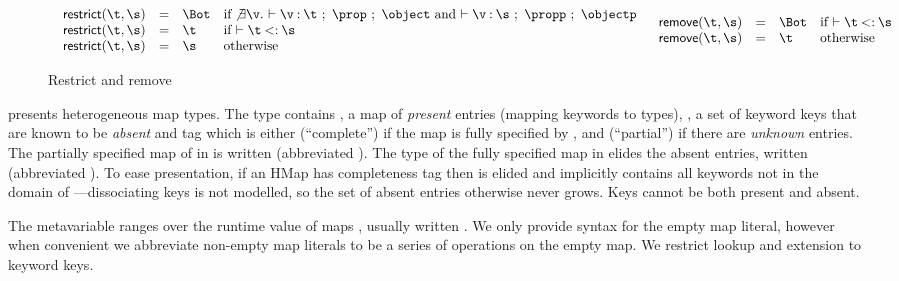 \begin{figure}
$$
\begin{array}{lr}
  \begin{array}{llll}
    \restrictfigure{}
  \end{array}
  \ \ 
  \begin{array}{llll}
    \removefigure{}
  \end{array}
\end{array}
$$
\caption{Restrict and remove}
\label{main:figure:restrictremove}
\end{figure}

presents
heterogeneous map types.
The type \HMapgeneric{\mandatory{}}{\absent{}}
contains {\mandatory{}}, a map of \emph{present} entries (mapping keywords to types),
\absent{}, a set of keyword keys that are known to be \emph{absent}
and
tag \completenessmeta{} which is either {\complete{}} (``complete'') if the map is fully specified by \mandatory{},
and {\partial{}} (``partial'') if there are \emph{unknown} entries.
%
The partially specified map of
 in 
is written
(abbreviated \Lunch).
%
The type of the fully specified map
 in  elides the absent entries,
written
(abbreviated \Breakfast).
To ease presentation, 
if an HMap has completeness tag \complete{} then \absent{} is elided and implicitly contains all keywords not in the domain of 
\mandatory{}---dissociating keys is not modelled, so the set of absent entries otherwise
never grows.
Keys cannot be both present and absent.

The metavariable \mapval{}
ranges over the runtime value of maps {\curlymapvaloverright{\k{}}{\v{}}},
usually written {\curlymapvaloverrightnoarrow{\k{}}{\v{}}}.
We %
only provide syntax for the empty map literal,
however when convenient we abbreviate non-empty map literals
to be a series of \assocliteral{} operations on the empty map.
We restrict lookup and extension to keyword keys. 

